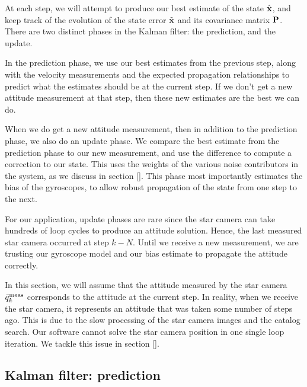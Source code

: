 At each step, we will attempt to produce our best estimate of the state $\hat{\textrm{\textbf{x}}}$, and keep track of the evolution of the state error $\tilde{\textrm{\textbf{x}}}$ and its covariance matrix $\textrm{\textbf{P}}$. There are two distinct phases in the Kalman filter: the prediction, and the update.

In the prediction phase, we use our best estimates from the previous step, along with the velocity measurements and the expected propagation relationships to predict what the estimates should be at the current step. If we don't get a new attitude measurement at that step, then these new estimates are the best we can do.

When we do get a new attitude measurement, then in addition to the prediction phase, we also do an update phase. We compare the best estimate from the prediction phase to our new measurement, and use the difference to compute a correction to our state. This uses the weights of the various noise contributors in the system, as we discuss in section []. This phase most importantly estimates the bias of the gyroscopes, to allow robust propagation of the state from one step to the next.

For our application, update phases are rare since the star camera can take hundreds of loop cycles to produce an attitude solution. Hence, the last measured star camera occurred at step $k-N$. Until we receive a new measurement, we are trusting our gyroscope model and our bias estimate to propagate the attitude correctly.

In this section, we will assume that the attitude measured by the star camera $\bar{q}^{\textrm{meas}}_k$ corresponds to the attitude at the current step. In reality, when we receive the star camera, it represents an attitude that was taken some number of steps ago. This is due to the slow processing of the star camera images and the catalog search. Our software cannot solve the star camera position in one single loop iteration. We tackle this issue in section []. 

\subsection{Kalman filter: prediction}


